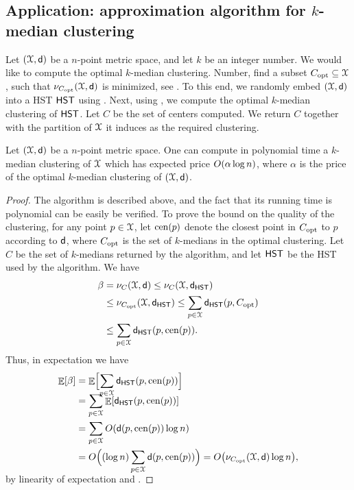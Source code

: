 \subsection{Application: approximation algorithm for $k$-median clustering}

Let $(\FMS,\DistChar)$ be a $n$-point metric space, and let $k$ be an
integer number. We would like to compute the optimal $k$-median
clustering. Number, find a subset $\Copt \subseteq \FMS$, such that
$\MdPrc_{\Copt}(\FMS,\DistChar)$ is minimized, see . To
this end, we randomly embed $(\FMS,\DistChar)$ into a HST $\HST$ using
. Next, using , we compute the optimal
$k$-median clustering of $\HST$. Let $C$ be the set of centers
computed. We return $C$ together with the partition of $\FMS$ it
induces as the required clustering.

\begin{theorem}
    Let $(\FMS,\DistChar)$ be a $n$-point metric space. One can compute in
    polynomial time a $k$-median clustering of $\FMS$ which has
    expected price $O\pth{ \alpha \log n }$, where $\alpha$ is the
    price of the optimal $k$-median clustering of $(\FMS,\DistChar)$.
\end{theorem}

\begin{proof}
    The algorithm is described above, and the fact that its running
    time is polynomial can be easily be verified. To prove the bound
    on the quality of the clustering, for any point $p \in \FMS$, let
    $\mathrm{cen}(p)$ denote the closest point in $C_{\mathrm{opt}}$ to $p$
    according to $\mathsf{d}$, where $C_{\mathrm{opt}}$ is the set of $k$-medians
    in the optimal clustering.  Let $C$ be the set of $k$-medians
    returned by the algorithm, and let $\HST$ be the HST used by the
    algorithm. We have
    \begin{align*}
        \beta%
        &=%
        \MdPrc_C(\FMS,\DistChar) \leq \MdPrc_C(\FMS,\DistChar_\HST)
        \\&
        \leq
        \MdPrc_{\Copt}(\FMS,\DistChar_\HST) \leq \sum_{p \in \FMS}
        \DistChar_\HST(p, \Copt)
        \\&
        \leq \sum_{p \in \FMS} \DistChar_\HST(p,
        \CenterPnt(p)).
    \end{align*}
    Thus, in expectation we have
    \begin{align*}
      \Ex{\beta}%
      &= %
        \Ex{ \Bigl. \smash{\sum_{p \in \FMS} \DistChar_\HST(p,
        \CenterPnt(p))}}%
      \\&
        =%
        \sum_{p \in \FMS} \Ex{ \DistChar_\HST(p, \CenterPnt(p))}
      \\&
        =  \sum_{p \in
        \FMS} O \pth{ \DistChar(p, \CenterPnt(p)) \log n }
      \\&%
      =%
      O\pth{ \Bigl. \smash{ (\log n)
      \sum_{p \in \FMS} \DistChar(p, \CenterPnt(p)) }}%
      =%
      O \pth{ \MdPrc_{\Copt}(\FMS,\DistChar) \log n},
    \end{align*}
    by linearity of expectation and .
\end{proof}




